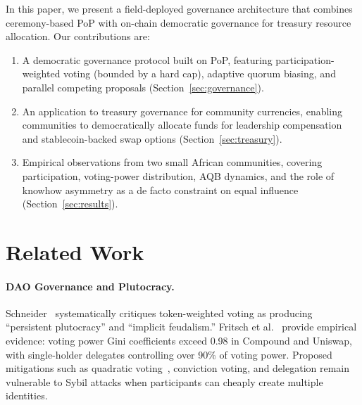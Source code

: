 \documentclass{svproc}
\begin{document}
In this paper, we present a field-deployed governance architecture that combines ceremony-based PoP with on-chain democratic governance for treasury resource allocation. Our contributions are:
\begin{enumerate}
\item A democratic governance protocol built on PoP, featuring participation-weighted voting (bounded by a hard cap), adaptive quorum biasing, and parallel competing proposals (Section~\ref{sec:governance}).
\item An application to treasury governance for community currencies, enabling communities to democratically allocate funds for leadership compensation and stablecoin-backed swap options (Section~\ref{sec:treasury}).
\item Empirical observations from two small African communities, covering participation, voting-power distribution, AQB dynamics, and the role of knowhow asymmetry as a de facto constraint on equal influence (Section~\ref{sec:results}).
\end{enumerate}

\section{Related Work}
\label{sec:related}

\paragraph{DAO Governance and Plutocracy.}
Schneider~\cite{schneider2024governable} systematically critiques token-weighted voting as producing ``persistent plutocracy'' and ``implicit feudalism.'' Fritsch et al.~\cite{fritsch2024analyzing} provide empirical evidence: voting power Gini coefficients exceed 0.98 in Compound and Uniswap, with single-holder delegates controlling over 90\% of voting power. Proposed mitigations such as quadratic voting~\cite{buterin2019flexible}, conviction voting, and delegation remain vulnerable to Sybil attacks when participants can cheaply create multiple identities.
\end{document}
